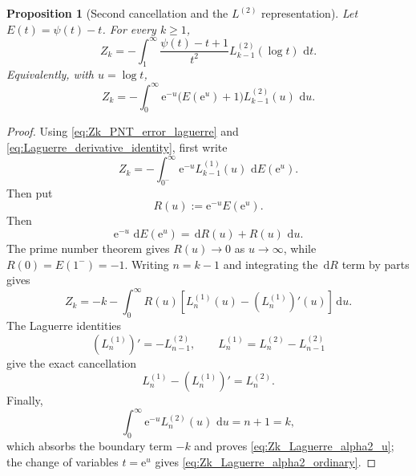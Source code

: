 \documentclass[11pt]{amsart}
\numberwithin{equation}{section}
\theoremstyle{plain}
\newtheorem{proposition}[theorem]{Proposition}
\theoremstyle{definition}
\theoremstyle{remark}
\newcommand{\e}{\mathrm e}
\newcommand{\dd}{\,\mathrm d}
\begin{document}
\begin{proposition}[Second cancellation and the $L^{(2)}$ representation]
\label{prop:Zk_second_cancellation_L2}
Let $E(t)=\psi(t)-t$.  For every $k\ge1$,
\begin{equation}
 \boxed{
 Z_k=-\int_1^\infty
 \frac{\psi(t)-t+1}{t^2}
 L_{k-1}^{(2)}(\log t)\,\dd t.}
 \label{eq:Zk_Laguerre_alpha2_ordinary}
\end{equation}
Equivalently, with $u=\log t$,
\begin{equation}
 Z_k=-\int_0^\infty
 \e^{-u}\bigl(E(\e^u)+1\bigr)L_{k-1}^{(2)}(u)\,\dd u.
 \label{eq:Zk_Laguerre_alpha2_u}
\end{equation}
\end{proposition}

\begin{proof}
Using \eqref{eq:Zk_PNT_error_laguerre} and \eqref{eq:Laguerre_derivative_identity}, first write
\begin{equation}
 Z_k=-\int_{0^-}^{\infty}\e^{-u}L_{k-1}^{(1)}(u)\,\dd E(\e^u).
 \label{eq:Zk_alpha1_before_second_cancellation}
\end{equation}
Then put
\begin{equation}
 R(u):=\e^{-u}E(\e^u).
\end{equation}
Then
\begin{equation}
 \e^{-u}\,\dd E(\e^u)=\dd R(u)+R(u)\,\dd u.
\end{equation}
The prime number theorem gives $R(u)\to0$ as $u\to\infty$, while $R(0)=E(1^-)=-1$.  Writing $n=k-1$ and integrating the $\dd R$ term by parts gives
\begin{equation}
 Z_k=-k-\int_0^\infty R(u)
 \left[L_n^{(1)}(u)-(L_n^{(1)})'(u)\right]\dd u.
\end{equation}
The Laguerre identities
\begin{equation}
 (L_n^{(1)})'=-L_{n-1}^{(2)},
 \qquad
 L_n^{(1)}=L_n^{(2)}-L_{n-1}^{(2)}
\end{equation}
give the exact cancellation
\begin{equation}
 L_n^{(1)}-(L_n^{(1)})'=L_n^{(2)}.
\end{equation}
Finally,
\begin{equation}
 \int_0^\infty \e^{-u}L_n^{(2)}(u)\,\dd u=n+1=k,
\end{equation}
which absorbs the boundary term $-k$ and proves \eqref{eq:Zk_Laguerre_alpha2_u}; the change of variables $t=\e^u$ gives \eqref{eq:Zk_Laguerre_alpha2_ordinary}.
\end{proof}
\end{document}
